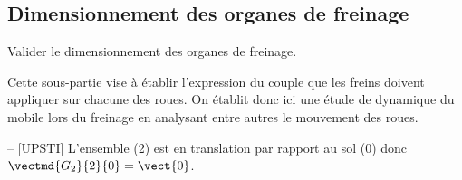 \subsection{Dimensionnement des organes de freinage}
\ifprof
\else
\begin{obj}
Valider le dimensionnement des organes de freinage.
\end{obj}

Cette sous-partie vise à établir l'expression du couple que les freins doivent appliquer sur chacune des roues. On établit donc ici une étude de dynamique du mobile lors du freinage en analysant entre autres le mouvement des roues.
\fi

\ifprof
\begin{corrige}-- [UPSTI]
L’ensemble (2) est en translation par rapport au sol (0) donc  $\vectmd{G_2}{2}{0} = \vect{0}$.
\end{corrige}
\else
\fi

